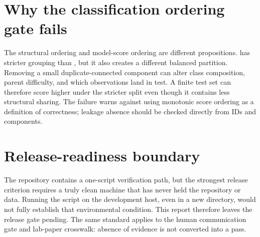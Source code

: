 \section{Why the classification ordering gate fails}

The structural ordering and model-score ordering are different propositions.  has stricter grouping than , but it also creates a different balanced partition. Removing a small duplicate-connected component can alter class composition, parent difficulty, and which observations land in test. A finite test set can therefore score higher under the stricter split even though it contains less structural sharing. The failure warns against using monotonic score ordering as a definition of correctness; leakage absence should be checked directly from IDs and components.

\section{Release-readiness boundary}

The repository contains a one-script verification path, but the strongest release criterion requires a truly clean machine that has never held the repository or data. Running the script on the development host, even in a new directory, would not fully establish that environmental condition. This report therefore leaves the release gate pending. The same standard applies to the human communication gate and lab-paper crosswalk: absence of evidence is not converted into a pass.

